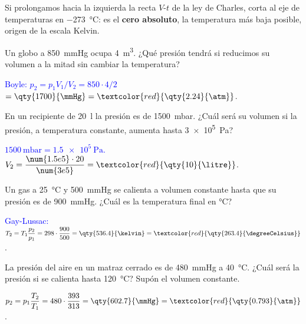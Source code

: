 Si prolongamos hacia la izquierda la recta \(V\)-\(t\) de la ley de Charles, corta al eje de temperaturas en
\qty{-273}{\degreeCelsius}: es el \textbf{cero absoluto}, la temperatura más baja posible, origen de la escala Kelvin.

\begin{exercise}
    Un globo a \qty{850}{\mmHg} ocupa \qty{4}{\cubic\metre}. ¿Qué presión tendrá si reducimos su volumen a la mitad sin cambiar la
    temperatura?
    \begin{solu}
        \textcolor{blue}{Boyle: \(p_2 = p_1 V_1 / V_2 = 850 \cdot 4 / 2\)} \(= \qty{1700}{\mmHg} = \textcolor{red}{\qty{2.24}{\atm}}\).
    \end{solu}
\end{exercise}

\begin{exercise}
    En un recipiente de \qty{20}{\litre} la presión es de \qty{1500}{\milli\bar}. ¿Cuál será su volumen si la presión, a
    temperatura constante, aumenta hasta \qty{3e5}{\pascal}?
    \begin{solu}
        \textcolor{blue}{\(\qty{1500}{\milli\bar} = \qty{1.5e5}{\pascal}\).} \(V_2 = \dfrac{\num{1.5e5} \cdot 20}{\num{3e5}} =
        \textcolor{red}{\qty{10}{\litre}}\).
    \end{solu}
\end{exercise}

\begin{exercise}
    Un gas a \qty{25}{\degreeCelsius} y \qty{500}{\mmHg} se calienta a volumen constante hasta que su presión es de
    \qty{900}{\mmHg}. ¿Cuál es la temperatura final en \unit{\degreeCelsius}?
    \begin{solu}
        \textcolor{blue}{Gay-Lussac:} \(T_2 = T_1 \dfrac{p_2}{p_1} = 298 \cdot \dfrac{900}{500} = \qty{536.4}{\kelvin} =
        \textcolor{red}{\qty{263.4}{\degreeCelsius}}\).
    \end{solu}
\end{exercise}

\begin{exercise}
    La presión del aire en un matraz cerrado es de \qty{480}{\mmHg} a \qty{40}{\degreeCelsius}. ¿Cuál será la presión si se
    calienta hasta \qty{120}{\degreeCelsius}? Supón el volumen constante.
    \begin{solu}
        \(p_2 = p_1 \dfrac{T_2}{T_1} = 480 \cdot \dfrac{393}{313} = \qty{602.7}{\mmHg} = \textcolor{red}{\qty{0.793}{\atm}}\).
    \end{solu}
\end{exercise}

